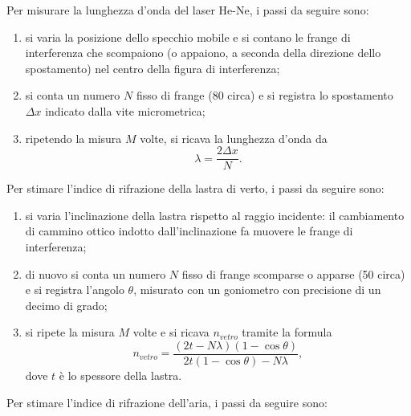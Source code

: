 \noindent
Per misurare la lunghezza d'onda del laser He-Ne, i passi da seguire sono:
\begin{enumerate}
    \item si varia la posizione dello specchio mobile e si contano le frange di interferenza che scompaiono (o appaiono, a seconda della direzione dello spostamento) nel centro della figura di interferenza; 
    \item si conta un numero $N$ fisso di frange (80 circa) e si registra lo spostamento $\Delta x$ indicato dalla vite micrometrica;
    \item ripetendo la misura $M$ volte, si ricava la lunghezza d'onda da
    \begin{equation}
        \lambda=\frac{2\Delta x}{N}.
    \end{equation}
\end{enumerate}
Per stimare l'indice di rifrazione della lastra di verto, i passi da seguire sono:
\begin{enumerate}
        \item si varia l'inclinazione della lastra rispetto al raggio incidente: il cambiamento di cammino ottico indotto dall'inclinazione fa muovere le frange di interferenza;
        \item di nuovo si conta un numero $N$ fisso di frange scomparse o apparse (50 circa) e si registra l'angolo $\theta$, misurato con un goniometro con precisione di un decimo di grado; 
        \item si ripete la misura $M$ volte e si ricava $n_{vetro}$ tramite la formula
        \begin{equation}
        n_{vetro}=\frac{(2t-N\lambda)(1-\cos{\theta})}{2t(1-\cos{\theta})-N\lambda},
    \end{equation}
    dove $t$ è lo spessore della lastra.
    \end{enumerate}
Per stimare l'indice di rifrazione dell'aria, i passi da seguire sono:
